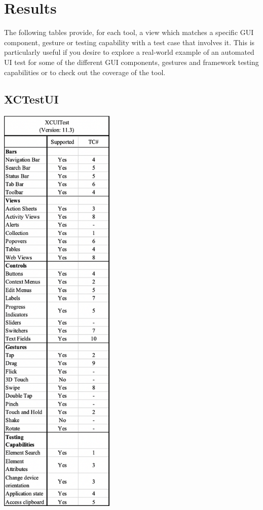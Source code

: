 \section{Results}
The following tables provide, for each tool, a view which matches a specific GUI component, gesture or testing capability with a test case that involves it. This is particularly useful if you desire to explore a real-world example of an automated UI test for some of the different GUI components, gestures and framework testing capabilities or to check out the coverage of the tool.


	\subsection{XCTestUI}
	\includegraphics[width=5.5cm]{img/table2.png} \\[2mm]
	
